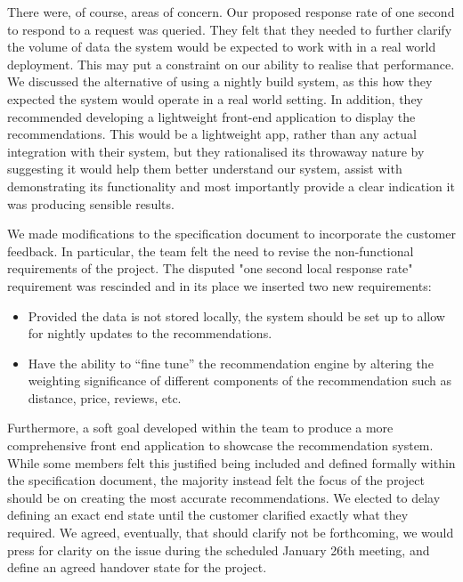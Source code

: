 \documentclass{l3proj}
\begin{document}

There were, of course, areas of concern. Our proposed response rate of one second to respond to a request was queried. They felt that they needed to further clarify the volume of data the system would be expected to work with in a real world deployment. This may put a constraint on our ability to realise that performance. We discussed the alternative of using a nightly build system, as this how they expected the system would operate in a real world setting. In addition, they recommended developing a lightweight front-end application to display the recommendations. This would be a lightweight app, rather than any actual integration with their system, but they rationalised its throwaway nature by suggesting it would help them better understand our system, assist with demonstrating its functionality and most importantly provide a clear indication it was producing sensible results. 

We made modifications to the specification document to incorporate the customer feedback. In particular, the team felt the need to revise the non-functional requirements of the project. The disputed "one second local response rate" requirement was rescinded and in its place we inserted two new requirements:

\begin{itemize}
\item Provided the data is not stored locally, the system should be set up to allow for nightly updates to the recommendations.
\item Have the ability to “fine tune” the recommendation engine by altering the weighting significance of different components of the recommendation such as distance, price, 
reviews, etc.
\end{itemize}

Furthermore, a soft goal developed within the team to produce a more comprehensive front end application to showcase the recommendation system. While some members felt this justified being included and defined formally within the specification document, the majority instead felt the focus of the project should be on creating the most accurate recommendations. We elected to delay defining an exact end state until the customer clarified exactly what they required. We agreed, eventually, that should clarify not be forthcoming, we would press for clarity on the issue during the scheduled January 26th meeting, and define an agreed handover state for the project. 
\end{document}

